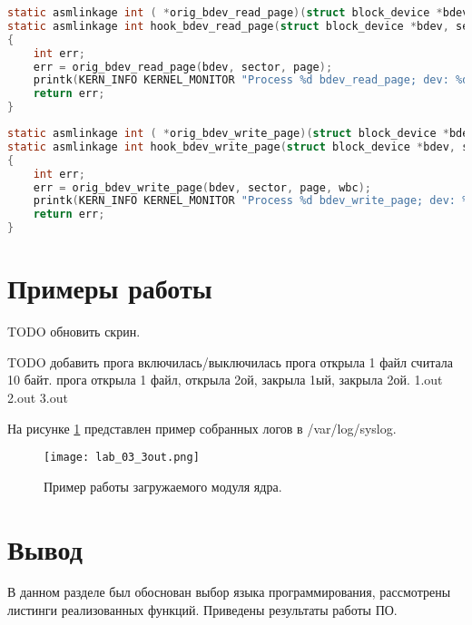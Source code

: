     \begin{lstlisting}[language=C, label=lst:ftrace-hooking:bdev_read_page, caption=Функция-обёртка функции bdev\_read\_page]
static asmlinkage int ( *orig_bdev_read_page)(struct block_device *bdev, sector_t sector, struct page *page);
static asmlinkage int hook_bdev_read_page(struct block_device *bdev, sector_t sector, struct page *page)
{
    int err;
    err = orig_bdev_read_page(bdev, sector, page);
    printk(KERN_INFO KERNEL_MONITOR "Process %d bdev_read_page; dev: %d\n", current->pid, bdev->bd_dev);
    return err;
}
    \end{lstlisting}

    \begin{lstlisting}[language=C, label=lst:ftrace-hooking:bdev_write_page, caption=Функция-обёртка функции bdev\_write\_page]
static asmlinkage int ( *orig_bdev_write_page)(struct block_device *bdev, sector_t sector, struct page *page, struct writeback_control *wbc);
static asmlinkage int hook_bdev_write_page(struct block_device *bdev, sector_t sector, struct page *page, struct writeback_control *wbc)
{
    int err;
    err = orig_bdev_write_page(bdev, sector, page, wbc);
    printk(KERN_INFO KERNEL_MONITOR "Process %d bdev_write_page; dev: %d\n", current->pid, bdev->bd_dev);
    return err;
}
    \end{lstlisting}

\section{Примеры работы}

    TODO обновить скрин.
    
    TODO добавить
    прога включилась/выключилась
    прога открыла 1 файл считала 10 байт.
    прога открыла 1 файл, открыла 2ой, закрыла 1ый, закрыла 2ой. 
    1.out
    2.out
    3.out



    На рисунке \ref{3out} представлен пример собранных логов в /var/log/syslog.
    \begin{figure}[h!]
        \centering
        \texttt{[image: lab\_03\_3out.png]}
        \caption{Пример работы загружаемого модуля ядра.}
        \label{3out}
    \end{figure}

\section{Вывод}
    В данном разделе был обоснован выбор языка программирования, 
    рассмотрены листинги реализованных функций. 
    Приведены результаты работы ПО.

\pagebreak